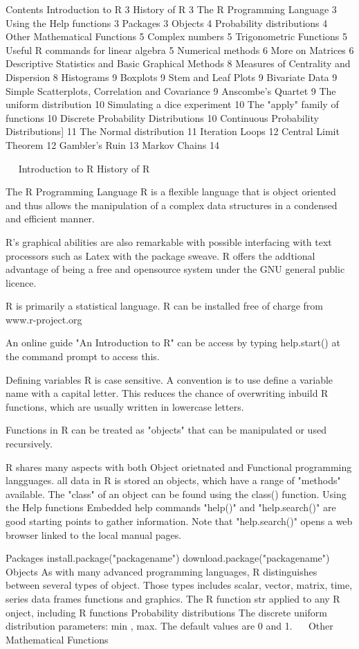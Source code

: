 Contents
Introduction to R	3
History of R	3
The R Programming Language	3
Using the Help functions	3
Packages	3
Objects	4
Probability distributions	4
Other Mathematical Functions	5
Complex numbers	5
Trigonometric  Functions	5
Useful R commands for linear algebra	5
Numerical methods	6
More on Matrices	6
Descriptive Statistics and Basic Graphical Methods	8
Measures of Centrality and Dispersion	8
Histograms	9
Boxplots	9
Stem and Leaf Plots	9
Bivariate Data	9
Simple Scatterplots, Correlation and Covariance	9
Anscombe’s Quartet	9
The uniform distribution	10
Simulating a dice experiment	10
The "apply" family of functions	10
Discrete Probability Distributions	10
Continuous Probability Distributions]	11
The Normal distribution	11
Iteration Loops	12
Central Limit Theorem	12
Gambler’s Ruin	13
Markov Chains	14

 
Introduction to R
History of R

The R Programming Language
R is a flexible language that is object oriented and thus allows the manipulation of a complex
data structures in a condensed and efficient manner.
 
R's graphical abilities are also remarkable with possible interfacing with text processors such as
Latex with the package sweave.
R offers the addtional advantage of being a free and opensource system under the GNU general
public licence.

R is primarily a statistical language.
R can be installed free of charge from www.r-project.org

An online guide "An Introduction to R" can be access by typing
help.start() at the command prompt to access this.

Defining variables
R is case sensitive.
A convention is to use define a variable name with a capital letter.
This reduces the chance of overwriting inbuild R functions, which are usually written in lowercase letters.


Functions in R can be treated as "objects" that can be manipulated or used recursively.

R shares many aspects with both Object orietnated and Functional programming langguages.
all data in R is stored an objects, which have a range of "methods" available.
The "class" of an object can be found using the class() function.
Using the Help functions
Embedded help commands "help()" and "help.search()" are good starting points to gather information. 
Note that "help.search()" opens a web browser linked to the local manual pages.
 
 
Packages 
install.package("packagename")
download.package("packagename")
Objects
As with many advanced programming languages, R distinguishes between several types of object. 
Those types includes scalar, vector, matrix, time, series data frames functions and graphics.
The R function str applied to any R onject, including R functions
Probability distributions
The discrete uniform distribution
parameters: min , max.
The default values are 0 and 1.
 
Other Mathematical Functions

